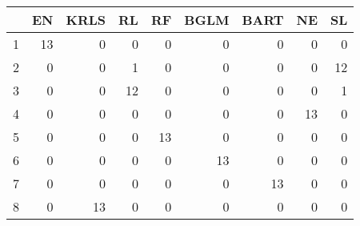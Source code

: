 \begin{table}[ht]
\centering
\begin{tabular}{rrrrrrrrr}
  \hline
 & EN & KRLS & RL & RF & BGLM & BART & NE & SL \\ 
  \hline
1 &  13 &   0 &   0 &   0 &   0 &   0 &   0 &   0 \\ 
  2 &   0 &   0 &   1 &   0 &   0 &   0 &   0 &  12 \\ 
  3 &   0 &   0 &  12 &   0 &   0 &   0 &   0 &   1 \\ 
  4 &   0 &   0 &   0 &   0 &   0 &   0 &  13 &   0 \\ 
  5 &   0 &   0 &   0 &  13 &   0 &   0 &   0 &   0 \\ 
  6 &   0 &   0 &   0 &   0 &  13 &   0 &   0 &   0 \\ 
  7 &   0 &   0 &   0 &   0 &   0 &  13 &   0 &   0 \\ 
  8 &   0 &  13 &   0 &   0 &   0 &   0 &   0 &   0 \\ 
   \hline
\end{tabular}
\end{table}
